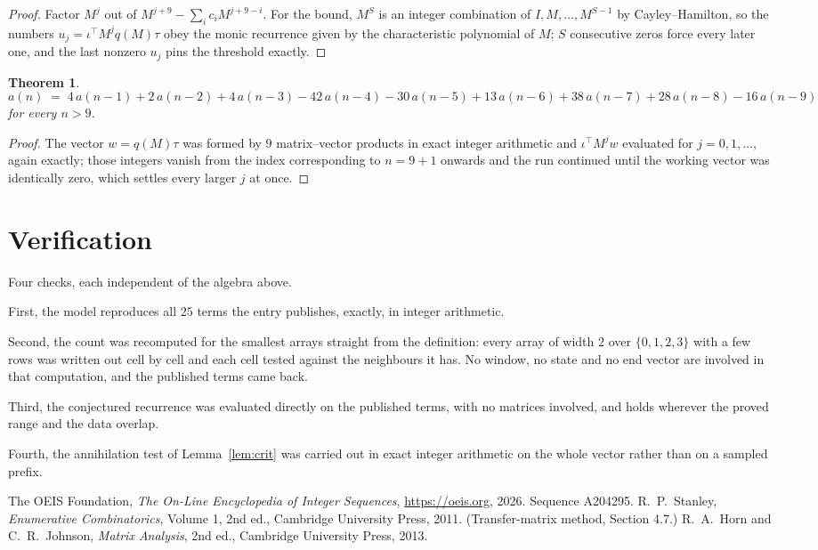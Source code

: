 \documentclass[11pt,a4paper]{article}
\theoremstyle{plain}
\newtheorem{theorem}{Theorem}
\theoremstyle{definition}
\begin{document}
\begin{proof}
Factor $M^{j}$ out of $M^{j+9}-\sum_ic_iM^{j+9-i}$. For the bound, $M^{S}$
is an integer combination of $I,M,\dots,M^{S-1}$ by Cayley--Hamilton, so the numbers
$u_j=\iota^{\!\top}M^{j}q(M)\tau$ obey the monic recurrence given by the characteristic
polynomial of $M$; $S$ consecutive zeros force every later one, and the last nonzero $u_j$
pins the threshold exactly.
\end{proof}

\begin{theorem}
\[
a(n)\;=\;4\,a(n-1) + 2\,a(n-2) + 4\,a(n-3) - 42\,a(n-4) - 30\,a(n-5) + 13\,a(n-6) + 38\,a(n-7) + 28\,a(n-8) - 16\,a(n-9)
\]
for every $n>9$.
\end{theorem}

\begin{proof}
The vector $w=q(M)\tau$ was formed by $9$ matrix--vector products in exact integer
arithmetic and $\iota^{\!\top}M^{j}w$ evaluated for $j=0,1,\dots$, again exactly; those
integers vanish from the index corresponding to $n=9+1$ onwards and the run continued
until the working vector was identically zero, which settles every larger $j$ at once.
\end{proof}

\section{Verification}

Four checks, each independent of the algebra above.

First, the model reproduces all $25$ terms the entry publishes, exactly, in integer
arithmetic.

Second, the count was recomputed for the smallest arrays straight from the definition: every
array of width $2$ over $\{0,1,2,3\}$ with a few rows was written out cell by cell and each cell
tested against the neighbours it has. No window, no state and no end vector are involved in that
computation, and the published terms came back.

Third, the conjectured recurrence was evaluated directly on the published terms, with no
matrices involved, and holds wherever the proved range and the data overlap.

Fourth, the annihilation test of Lemma~\ref{lem:crit} was carried out in exact integer
arithmetic on the whole vector rather than on a sampled prefix.

\begin{thebibliography}{9}
 The OEIS Foundation, \emph{The On-Line Encyclopedia of Integer
Sequences}, \url{https://oeis.org}, 2026. Sequence A204295.
 R.~P.~Stanley, \emph{Enumerative Combinatorics}, Volume 1, 2nd ed.,
Cambridge University Press, 2011. (Transfer-matrix method, Section 4.7.)
 R.~A.~Horn and C.~R.~Johnson, \emph{Matrix Analysis}, 2nd ed., Cambridge
University Press, 2013.
\end{thebibliography}
\end{document}
